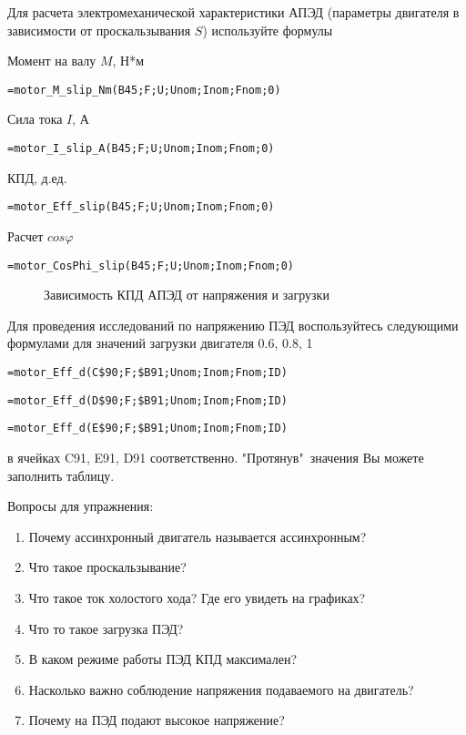 Для расчета электромеханической характеристики АПЭД (параметры двигателя в зависимости от проскальзывания $S$) используйте формулы

Момент на валу $M$, Н*м 

{ \small  \texttt{=motor\_M\_slip\_Nm(B45;F;U;Unom;Inom;Fnom;0)}}

Сила тока $I$, А

{ \small  \texttt{=motor\_I\_slip\_A(B45;F;U;Unom;Inom;Fnom;0)}}

КПД, д.ед.

{ \small  \texttt{=motor\_Eff\_slip(B45;F;U;Unom;Inom;Fnom;0)}}

Расчет $cos \varphi $

{ \small  \texttt{=motor\_CosPhi\_slip(B45;F;U;Unom;Inom;Fnom;0)}}


\begin{figure}[h!]
	\center{\texttt{[image: Ex80\_3]}}
	\caption{Зависимость КПД АПЭД от напряжения и загрузки}
	\label{ris:Ex80_3}
\end{figure}

Для проведения исследований по напряжению ПЭД воспользуйтесь следующими формулами для значений загрузки двигателя 0.6, 0.8, 1 

{ \small  \texttt{=motor\_Eff\_d(C\$90;F;\$B91;Unom;Inom;Fnom;ID)}}

{ \small  \texttt{=motor\_Eff\_d(D\$90;F;\$B91;Unom;Inom;Fnom;ID)}}

{ \small  \texttt{=motor\_Eff\_d(E\$90;F;\$B91;Unom;Inom;Fnom;ID)}}

в ячейках C91, E91, D91 соответственно. "Протянув"\ значения Вы можете заполнить таблицу.

Вопросы для упражнения:

\begin{enumerate}
	\item Почему ассинхронный двигатель называется ассинхронным?
	\item Что такое проскальзывание?
	\item Что такое ток холостого хода? Где его увидеть на графиках?
	\item Что то такое загрузка ПЭД?
	\item В каком режиме работы ПЭД КПД максимален?
	\item Насколько важно соблюдение напряжения подаваемого на двигатель?
	\item Почему на ПЭД подают высокое напряжение?
\end{enumerate}


